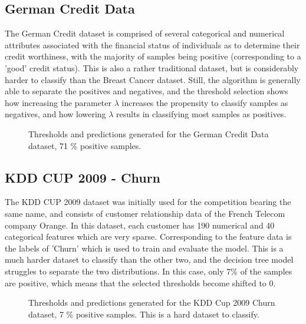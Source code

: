 \documentclass{article}
\begin{document}
\subsection{German Credit Data}
The German Credit dataset is comprised of several categorical and numerical attributes associated with the financial status of individuals as to determine their credit worthiness, with the majority of samples being positive (corresponding to a 'good' credit status). This is also a rather traditional dataset, but is considerably harder to classify than the Breast Cancer dataset. Still, the algorithm is generally able to separate the positives and negatives, and the threshold selection shows how increasing the parameter $\lambda$ increases the propensity to classify samples as negatives, and how lowering $\lambda$ results in classifying most samples as positives.
\begin{figure}[H]
    \centering
    \scalebox{.8}{}
    \caption{Thresholds and predictions generated for the German Credit Data dataset, 71 \% positive samples.}
\end{figure}

\subsection{KDD CUP 2009 - Churn}
    The KDD CUP 2009 dataset was initially used for the competition bearing the same name, and consists of customer relationship data of the French Telecom company Orange. In this dataset, each customer has 190 numerical and 40 categorical features which are very sparse. Corresponding to the feature data is the labels of 'Churn' which is used to train and evaluate the model. This is a much harder dataset to classify than the other two, and the decision tree model struggles to separate the two distributions. In this case, only 7\% of the samples are positive, which means that the selected thresholds become shifted to 0.
\begin{figure}[H]
    \centering
    \scalebox{.8}{}
    \caption{Thresholds and predictions generated for the KDD Cup 2009 Churn dataset, 7 \% positive samples. This is a hard dataset to classify.}
\end{figure}

\end{document}
